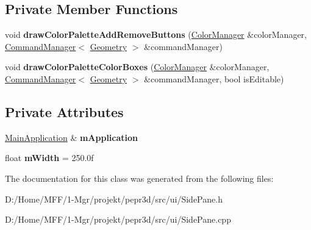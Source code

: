 \subsection*{Private Member Functions}
\begin{DoxyCompactItemize}
\item 
\mbox{\label{classpepr3d_1_1_side_pane_a661999aa5735d68c9ac36fa07722ed5b}} 
void {\bfseries draw\+Color\+Palette\+Add\+Remove\+Buttons} (\mbox{\hyperlink{classpepr3d_1_1_color_manager}{Color\+Manager}} \&color\+Manager, \mbox{\hyperlink{classpepr3d_1_1_command_manager}{Command\+Manager}}$<$ \mbox{\hyperlink{classpepr3d_1_1_geometry}{Geometry}} $>$ \&command\+Manager)
\item 
\mbox{\label{classpepr3d_1_1_side_pane_a38039d44d10317e493730141b058d193}} 
void {\bfseries draw\+Color\+Palette\+Color\+Boxes} (\mbox{\hyperlink{classpepr3d_1_1_color_manager}{Color\+Manager}} \&color\+Manager, \mbox{\hyperlink{classpepr3d_1_1_command_manager}{Command\+Manager}}$<$ \mbox{\hyperlink{classpepr3d_1_1_geometry}{Geometry}} $>$ \&command\+Manager, bool is\+Editable)
\end{DoxyCompactItemize}
\subsection*{Private Attributes}
\begin{DoxyCompactItemize}
\item 
\mbox{\label{classpepr3d_1_1_side_pane_ab3342d437643b373b886c13fadbe2708}} 
\mbox{\hyperlink{classpepr3d_1_1_main_application}{Main\+Application}} \& {\bfseries m\+Application}
\item 
\mbox{\label{classpepr3d_1_1_side_pane_a943018559d65596c1c5822ca50495e8d}} 
float {\bfseries m\+Width} = 250.\+0f
\end{DoxyCompactItemize}


The documentation for this class was generated from the following files\+:\begin{DoxyCompactItemize}
\item 
D\+:/\+Home/\+M\+F\+F/1-\/\+Mgr/projekt/pepr3d/src/ui/Side\+Pane.\+h\item 
D\+:/\+Home/\+M\+F\+F/1-\/\+Mgr/projekt/pepr3d/src/ui/Side\+Pane.\+cpp\end{DoxyCompactItemize}

